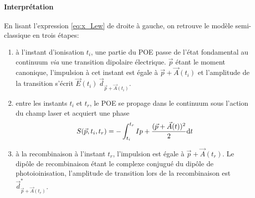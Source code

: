 \paragraph{Interprétation} En lisant l'expression \ref{eq:x_Lew} de droite à gauche, on retrouve le modèle semi-classique en trois étapes:
\begin{enumerate}[label=(\arabic*)]
\item à l'instant d'ionisation $t_i$, une partie du POE passe de l'état fondamental au continuum \textit{via} une transition dipolaire électrique. $\vec{p}$ étant le moment canonique, l'impulsion à cet instant est égale à $\vec{p} + \vec{A}(t_i)$ et l'amplitude de la transition s'écrit $\vec{E}(t_i) \: \vec{d}_{\vec{p}+\vec{A}(t_i)}$.
\item entre les instants $t_i$ et $t_r$, le POE se propage dans le continuum sous l'action du champ laser et acquiert une phase 
\begin{equation}
S(\vec{p}, t_i, t_r) = - \int_{t_i}^{t_r} Ip + \frac{(\vec{p} + \vec{A}(t))^2}{2} \mathrm{d} t
\end{equation}
\item à la recombinaison à l'instant $t_r$, l'impulsion est égale à $\vec{p} + \vec{A}(t_r)$. Le dipôle de recombinaison étant le complexe conjugué du dipôle de photoioinisation, l'amplitude de transition lors de la recombinaison est $\vec{d}^*_{\vec{p}+\vec{A}(t_r)}$.
\end{enumerate}

